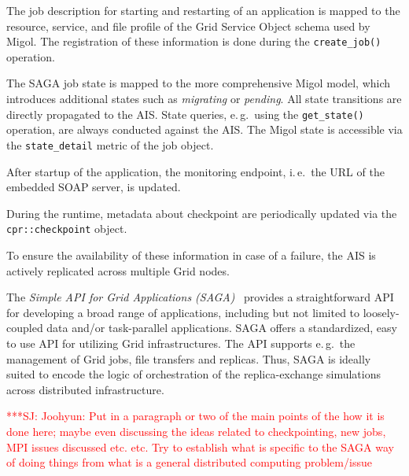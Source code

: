 \documentclass[times, 10pt, twocolumn]{article}
\newcommand{\jhanote}[1]{ {\textcolor{red} { ***SJ: #1 }}}
\newcommand{\jhanote}[1]{}
\newcommand{\up}{\vspace*{-1em}}
\begin{document}
\begin{compactitem}
\item The job description for starting and restarting of an
  application is mapped to the resource, service, and file profile of
  the Grid Service Object schema used by Migol. The registration of
  these information is done during the \texttt{create\_job()}
  operation.
\item The SAGA job state is mapped to the more comprehensive Migol
  model, which introduces additional states such as \emph{migrating}
  or \emph{pending}. All state transitions are directly propagated to
  the AIS. State queries, e.\,g.\ using the \texttt{get\_state()}
  operation, are always conducted against the AIS. The Migol state is
  accessible via the \texttt{state\_detail} metric of the job object.
\item After startup of the application, the monitoring endpoint,
  i.\,e.\ the URL of the embedded SOAP server, is updated.
\item During the runtime, metadata about checkpoint are periodically
  updated via the \texttt{cpr::checkpoint} object.
\end{compactitem}

To ensure the availability of these information in case of a failure,
the AIS is actively replicated across multiple Grid nodes.




\up
The \emph{Simple API for Grid Applications (SAGA)}~\cite{saga_gfd90}
provides a straightforward API for developing a broad range of
applications, including but not limited to loosely-coupled data and/or
task-parallel applications.
SAGA offers a standardized, easy to use API for utilizing Grid
infrastructures. The API supports e.\,g.\ the management of Grid jobs,
file transfers and replicas. Thus, SAGA is ideally suited to encode
the logic of orchestration of the replica-exchange simulations across
distributed infrastructure.

\jhanote{Joohyun: Put in a paragraph or two of the main points of the
  how it is done here; maybe even discussing the ideas related to
  checkpointing, new jobs, MPI issues discussed etc. etc. Try to
  establish what is specific to the SAGA way of doing things from what
  is a general distributed computing problem/issue}
\end{document}
